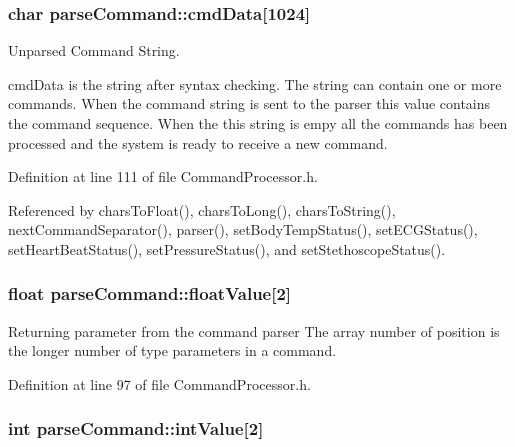 \hypertarget{structparse_command_a01d90da128793f2c09ce31ce4a9f2ce5}{
\subsubsection[{cmd\-Data}]{\setlength{\rightskip}{0pt plus 5cm}char parse\-Command\-::cmd\-Data\mbox{[}1024\mbox{]}}}\label{structparse_command_a01d90da128793f2c09ce31ce4a9f2ce5}


Unparsed Command String. 

cmd\-Data is the string after syntax checking. The string can contain one or more commands. When the command string is sent to the parser this value contains the command sequence. When the this string is empy all the commands has been processed and the system is ready to receive a new command. 

Definition at line 111 of file Command\-Processor.\-h.



Referenced by chars\-To\-Float(), chars\-To\-Long(), chars\-To\-String(), next\-Command\-Separator(), parser(), set\-Body\-Temp\-Status(), set\-E\-C\-G\-Status(), set\-Heart\-Beat\-Status(), set\-Pressure\-Status(), and set\-Stethoscope\-Status().

\hypertarget{structparse_command_a475f06e9e3728cc583008ad66dc48329}{
\subsubsection[{float\-Value}]{\setlength{\rightskip}{0pt plus 5cm}float parse\-Command\-::float\-Value\mbox{[}2\mbox{]}}}\label{structparse_command_a475f06e9e3728cc583008ad66dc48329}


Returning parameter from the command parser The array number of position is the longer number of type parameters in a command. 



Definition at line 97 of file Command\-Processor.\-h.

\hypertarget{structparse_command_a9ad775810b79683631510fd333096c6f}{
\subsubsection[{int\-Value}]{\setlength{\rightskip}{0pt plus 5cm}int parse\-Command\-::int\-Value\mbox{[}2\mbox{]}}}\label{structparse_command_a9ad775810b79683631510fd333096c6f}


